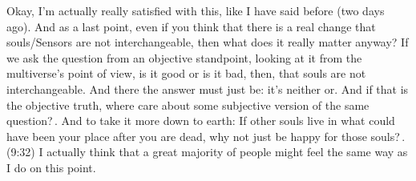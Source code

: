 \documentclass{report}
\begin{document}
Okay, I'm actually really satisfied with this, like I have said before (two days ago). And as a last point, even if you think that there is a real change that souls/Sensors are not interchangeable, then what does it really matter anyway? If we ask the question from an objective standpoint, looking at it from the multiverse's point of view, is it good or is it bad, then, that souls are not interchangeable. And there the answer must just be: it's neither or. And if that is the objective truth, where care about some subjective version of the same question?\,. And to take it more down to earth: If other souls live in what could have been your place after you are dead, why not just be happy for those souls?\,. (9:32) I actually think that a great majority of people might feel the same way as I do on this point.
\end{document}
